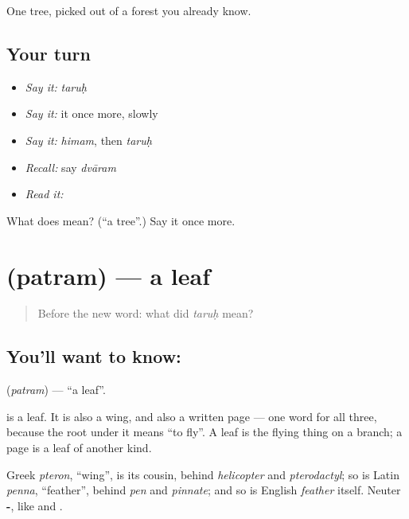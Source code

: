 \begin{grammarlens}[title={What you've built}]
One tree, picked out of a forest you already know.
\end{grammarlens}

\subsection*{Your turn}
\begin{itemize}
\raggedright
  \item \emph{Say it:} \emph{taruḥ}
  \item \emph{Say it:} it once more, slowly
  \item \emph{Say it:} \emph{himam}, then \emph{taruḥ}
  \item \emph{Recall:} say \emph{dvāram}
  \item \emph{Read it:} \textbf{}
\end{itemize}

\begin{tcolorbox}[breakable,colback=teal!4,colframe=teal!35!black,title={Before you move on}]
What does  mean? (\textquotedblleft{}a tree\textquotedblright{}.) Say it once more.
\end{tcolorbox}
\section[\texorpdfstring{\sk{पत्रम्} (patram)}{पत्रम् (patram)}]{ (patram) — a leaf}

\label{lesson:SA-C32-leaf}



\begin{quote}
Before the new word: what did \emph{taruḥ} mean?
\end{quote}

\subsection*{You'll want to know: }
\textbf{} (\emph{patram}) — \textquotedblleft{}a leaf\textquotedblright{}.

\textbf{} is a leaf. It is also a wing, and also a written page — one word for all three, because the root under it means \textquotedblleft{}to fly\textquotedblright{}. A leaf is the flying thing on a branch; a page is a leaf of another kind.

Greek \emph{pteron}, \textquotedblleft{}wing\textquotedblright{}, is its cousin, behind \emph{helicopter} and \emph{pterodactyl}; so is Latin \emph{penna}, \textquotedblleft{}feather\textquotedblright{}, behind \emph{pen} and \emph{pinnate}; and so is English \emph{feather} itself. Neuter \textbf{-}, like \textbf{} and \textbf{}.

